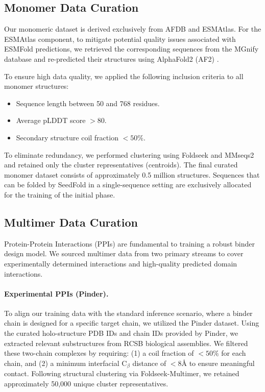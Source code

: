 \documentclass[]{bytedance_seed}
\begin{document}
\subsection{Monomer Data Curation}
Our monomeric dataset is derived exclusively from AFDB and ESMAtlas. For the ESMAtlas component, to mitigate potential quality issues associated with ESMFold \cite{lin2023evolutionary} predictions, we retrieved the corresponding sequences from the MGnify database \cite{richardson2023mgnify} and re-predicted their structures using AlphaFold2 (AF2) \cite{jumper2021highly}. 

To ensure high data quality, we applied the following inclusion criteria to all monomer structures:
\begin{itemize}
    \item Sequence length between 50 and 768 residues.
    \item Average pLDDT score $> 80$.
    \item Secondary structure coil fraction $< 50\%$.
\end{itemize}
To eliminate redundancy, we performed clustering using Foldseek \cite{vankempenFastAccurateProtein2024} and MMseqs2 \cite{steineggerMMseqs2EnablesSensitive2017} and retained only the cluster representatives (centroids). The final curated monomer dataset consists of approximately 0.5 million structures. Sequences that can be folded by SeedFold \cite{seedfold} in a single-sequence setting are exclusively allocated for the training of the initial phase.

\subsection{Multimer Data Curation}
Protein-Protein Interactions (PPIs) are fundamental to training a robust binder design model. We sourced multimer data from two primary streams to cover experimentally determined interactions and high-quality predicted domain interactions.

\paragraph{Experimental PPIs (Pinder).} 
To align our training data with the standard inference scenario, where a binder chain is designed for a specific target chain, we utilized the Pinder dataset. Using the curated holo-structure PDB IDs and chain IDs provided by Pinder, we extracted relevant substructures from RCSB biological assemblies. We filtered these two-chain complexes by requiring: (1) a coil fraction of $< 50\%$ for each chain, and (2) a minimum interfacial C$_\beta$ distance of $< 8\text{\AA}$ to ensure meaningful contact. Following structural clustering via Foldseek-Multimer, we retained approximately 50,000 unique cluster representatives.
\end{document}

